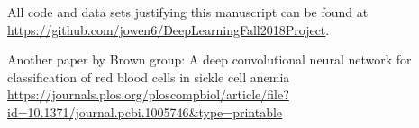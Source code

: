 \documentclass[review,leqno]{siamart1116}
\newcommand{\peng}[1]{{\color{cyan}#1}}
\begin{document}
All code and data sets justifying this manuscript can be found at
\url{https://github.com/jowen6/DeepLearningFall2018Project}.

\peng{
Another paper by Brown group:
A deep convolutional neural network for
classification of red blood cells in sickle cell
anemia
\url{https://journals.plos.org/ploscompbiol/article/file?id=10.1371/journal.pcbi.1005746&type=printable}
}







 

\end{document}
